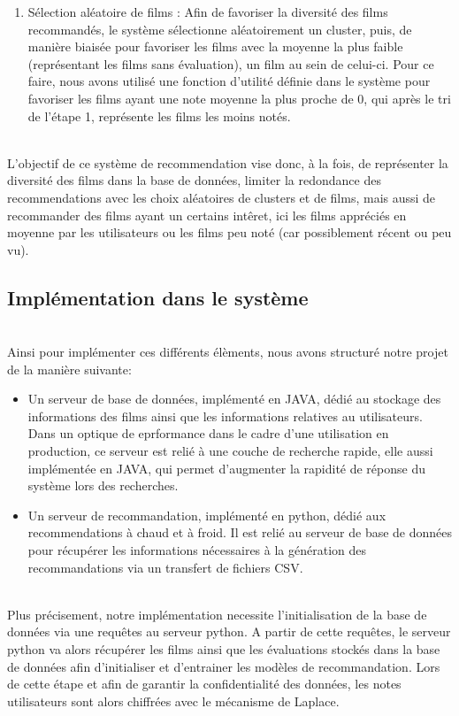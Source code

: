 \documentclass{article}
\begin{document}
\begin{itemize}
\begin{enumerate}
              \item Sélection aléatoire de films : Afin de favoriser la diversité des films recommandés, le système sélectionne aléatoirement un cluster, puis, de manière biaisée pour favoriser les films avec la moyenne la plus faible (représentant les films sans évaluation), un film au sein de celui-ci.
                    Pour ce faire, nous avons utilisé une fonction d'utilité définie dans le système pour favoriser les films ayant une note moyenne la plus proche de 0, qui après le tri de l'étape 1, représente les films les moins notés.
          \end{enumerate}
          $ $\\
          L'objectif de ce système de recommendation vise donc, à la fois, de représenter la diversité des films dans la base de données, limiter la redondance des recommendations avec les choix aléatoires de clusters et de films, mais aussi de recommander des films
          ayant un certains intêret, ici les films appréciés en moyenne par les utilisateurs ou les films peu noté (car possiblement récent ou peu vu).\\

\end{itemize}


\subsection{Implémentation dans le système}
$ $\\
Ainsi pour implémenter ces différents élèments, nous avons structuré notre projet de la manière suivante:\\
\begin{itemize}
    \item Un serveur de base de données, implémenté en JAVA, dédié au stockage des informations des films ainsi que les informations relatives au utilisateurs.
    Dans un optique de eprformance dans le cadre d'une utilisation en production, ce serveur est relié à une couche de recherche rapide, elle aussi implémentée en JAVA, 
    qui permet d'augmenter la rapidité de réponse du système lors des recherches.
    \item Un serveur de recommandation, implémenté en python, dédié aux recommendations à chaud et à froid. Il est relié au serveur de base de données pour récupérer les 
    informations nécessaires à la génération des recommandations via un transfert de fichiers CSV.
\end{itemize}
$ $\\
Plus précisement, notre implémentation necessite l'initialisation de la base de données via une requêtes au serveur python. A partir de cette requêtes, le serveur python va alors 
récupérer les films ainsi que les évaluations stockés dans la base de données afin d'initialiser et d'entrainer les modèles de recommandation. Lors de cette étape et afin de garantir 
la confidentialité des données, les notes utilisateurs sont alors chiffrées avec le mécanisme de Laplace.
\end{document}
